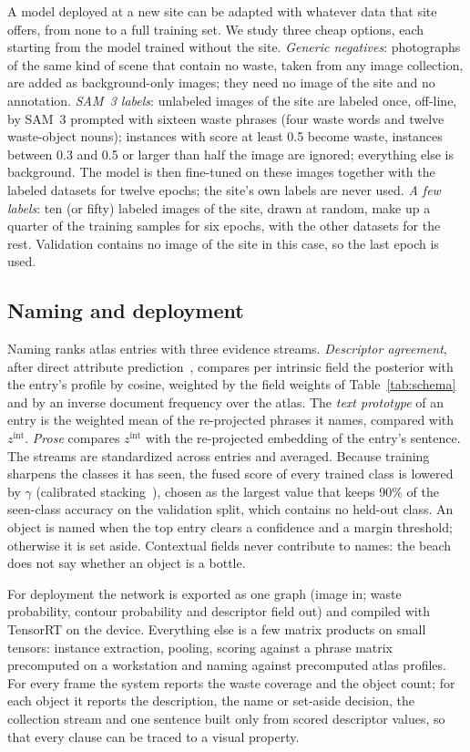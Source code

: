 \documentclass[pdflatex,sn-basic,Numbered]{sn-jnl}%
\begin{document}
A model deployed at a new site can be adapted with whatever data that site offers, from none to a full training set. We study three cheap options, each starting from the model trained without the site. \emph{Generic negatives}: photographs of the same kind of scene that contain no waste, taken from any image collection, are added as background-only images; they need no image of the site and no annotation. \emph{SAM~3 labels}: unlabeled images of the site are labeled once, off-line, by SAM~3 prompted with sixteen waste phrases (four waste words and twelve waste-object nouns); instances with score at least 0.5 become waste, instances between 0.3 and 0.5 or larger than half the image are ignored; everything else is background. The model is then fine-tuned on these images together with the labeled datasets for twelve epochs; the site's own labels are never used. \emph{A few labels}: ten (or fifty) labeled images of the site, drawn at random, make up a quarter of the training samples for six epochs, with the other datasets for the rest. Validation contains no image of the site in this case, so the last epoch is used.

\subsection{Naming and deployment}\label{sec:naming}
Naming ranks atlas entries with three evidence streams. \emph{Descriptor agreement}, after direct attribute prediction~\cite{lampert2014dap}, compares per intrinsic field the posterior with the entry's profile by cosine, weighted by the field weights of Table~\ref{tab:schema} and by an inverse document frequency over the atlas. The \emph{text prototype} of an entry is the weighted mean of the re-projected phrases it names, compared with $z^{\mathrm{int}}$. \emph{Prose} compares $z^{\mathrm{int}}$ with the re-projected embedding of the entry's sentence. The streams are standardized across entries and averaged. Because training sharpens the classes it has seen, the fused score of every trained class is lowered by $\gamma$ (calibrated stacking~\cite{chao2016gzsl}), chosen as the largest value that keeps 90\% of the seen-class accuracy on the validation split, which contains no held-out class. An object is named when the top entry clears a confidence and a margin threshold; otherwise it is set aside. Contextual fields never contribute to names: the beach does not say whether an object is a bottle.

For deployment the network is exported as one graph (image in; waste probability, contour probability and descriptor field out) and compiled with TensorRT on the device. Everything else is a few matrix products on small tensors: instance extraction, pooling, scoring against a phrase matrix precomputed on a workstation and naming against precomputed atlas profiles. For every frame the system reports the waste coverage and the object count; for each object it reports the description, the name or set-aside decision, the collection stream and one sentence built only from scored descriptor values, so that every clause can be traced to a visual property.
\end{document}
